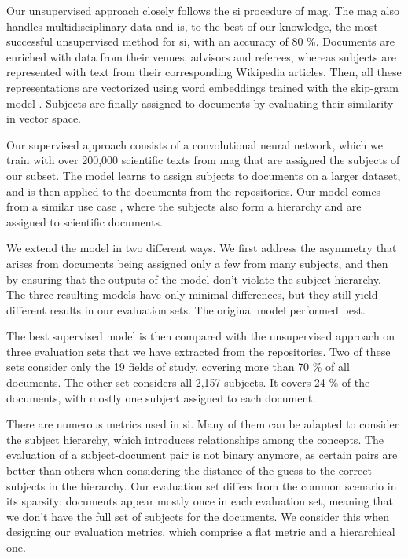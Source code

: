 Our unsupervised approach closely follows the \acrshort{si} procedure of \acrshort{mag}. The \acrshort{mag} also handles multidisciplinary data and is, to the best of our knowledge, the most successful unsupervised method for \acrshort{si}, with an accuracy of 80 \%. Documents are enriched with data from their venues, advisors and referees, whereas subjects are represented with text from their corresponding Wikipedia articles. Then, all these representations are vectorized using word embeddings trained with the skip-gram model \cite{mikolov2013distributed}. Subjects are finally assigned to documents by evaluating their similarity in vector space.

Our supervised approach consists of a convolutional neural network, which we train with over 200,000 scientific texts from \acrshort{mag} that are assigned the subjects of our subset. The model learns to assign subjects to documents on a larger dataset, and is then applied to the documents from the repositories. Our model comes from a similar use case \cite{gargiulo2019deep}, where the subjects also form a hierarchy and are assigned to scientific documents.

We extend the model in two different ways. We first address the asymmetry that arises from documents being assigned only a few from many subjects, and then by ensuring that the outputs of the model don't violate the subject hierarchy. The three resulting models have only minimal differences, but they still yield different results in our evaluation sets. The original model performed best.

The best supervised model is then compared with the unsupervised approach on three evaluation sets that we have extracted from the repositories. Two of these sets consider only the 19 fields of study, covering more than 70 \% of all documents. The other set considers all 2,157 subjects. It covers 24 \% of the documents, with mostly one subject assigned to each document.

There are numerous metrics used in \acrshort{si}. Many of them can be adapted to consider the subject hierarchy, which introduces relationships among the concepts. The evaluation of a subject-document pair is not binary anymore, as certain pairs are better than others when considering the distance of the guess to the correct subjects in the hierarchy. Our evaluation set differs from the common scenario in its sparsity: documents appear mostly once in each evaluation set, meaning that we don't have the full set of subjects for the documents. We consider this when designing our evaluation metrics, which comprise a flat metric and a hierarchical one.

